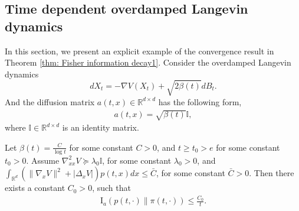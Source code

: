 \documentclass[11pt,reqno]{amsart}
\newcommand{\bea}{\begin{eqnarray}}
\newcommand{\eea}{\end{eqnarray}}
\newcommand{\beaa}{\begin{eqnarray*}}
\newcommand{\eeaa}{\end{eqnarray*}}
\def\hR{\mathbb{R}}
\begin{document}
\subsection{Time dependent overdamped Langevin dynamics}
In this section, we present an explicit example of the convergence result in Theorem \ref{thm: Fisher information decay1}. Consider the overdamped Langevin dynamics
\begin{equation}\label{eq:langevin}
    dX_t=-\nabla V(X_t)+\sqrt{2\beta(t)}dB_t.
\end{equation}
And the diffusion matrix $a(t,x)\in\hR^{d\times d}$ has the following form,
\bea\label{defn: beta}
a(t,x)=\sqrt{\beta(t)}\mathbb{I}, 
\eea
where $\mathbb{I}\in \mathbb{R}^{d\times d}$ is an identity matrix. 
\begin{corollary}\label{cor: Fisher information decay} Let $\beta(t)=\frac{C}{\log t}$ for some constant $C>0$, and $t\ge t_0>e$ for some constant $t_0>0$. Assume $\nabla^2_{xx}V \succeq \lambda_0\mathbb I$, for some constant $\lambda_0>0$, and $\int_{\hR^d} ( \|\nabla_x V\|^2+|\Delta_x V| ) {p} (t,x)dx \le \bar C$, for some constant $\bar C>0$. Then there exists a constant $C_0>0$, such that 
	\beaa 
	 \mathrm I_{a}({p} (t,\cdot)\|\pi(t,\cdot))\leq \frac{C_0}{t}. 
	\eeaa 
\end{corollary}
\end{document}
